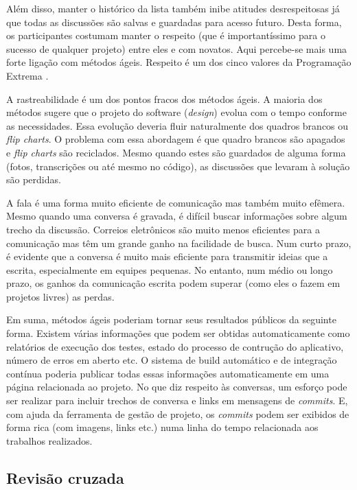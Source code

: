 Além disso, manter o histórico da lista também inibe atitudes
desrespeitosas já que todas as discussões são salvas e guardadas para
acesso futuro. Desta forma, os participantes costumam manter o
respeito (que é importantíssimo para o sucesso de qualquer projeto)
entre eles e com novatos. Aqui percebe-se mais uma forte ligação com
métodos ágeis. Respeito é um dos cinco valores da Programação Extrema
\cite{XP02}.

A rastreabilidade é um dos pontos fracos dos métodos ágeis. A maioria
dos métodos sugere que o projeto do software (\emph{design}) evolua
com o tempo conforme as necessidades. Essa evolução deveria fluir
naturalmente dos quadros brancos ou \emph{flip charts}. O problema com
essa abordagem é que quadro brancos são apagados e \emph{flip charts}
são reciclados.  Mesmo quando estes são guardados de alguma forma
(fotos, transcrições ou até mesmo no código), as discussões que
levaram à solução são perdidas.

A fala é uma forma muito eficiente de comunicação mas também muito
efêmera. Mesmo quando uma conversa é gravada, é difícil buscar
informações sobre algum trecho da discussão. Correios eletrônicos são
muito menos eficientes para a comunicação mas têm um grande ganho na
facilidade de busca. Num curto prazo, é evidente que a conversa é
muito mais eficiente para transmitir ideias que a escrita,
especialmente em equipes pequenas. No entanto, num médio ou longo
prazo, os ganhos da comunicação escrita podem superar (como eles o
fazem em projetos livres) as perdas.

Em suma, métodos ágeis poderiam tornar seus resultados públicos da
seguinte forma. Existem várias informações que podem ser obtidas
automaticamente como relatórios de execução dos testes, estado do
processo de contrução do aplicativo, número de erros em aberto etc.
O sistema de build automático e de integração contínua poderia
publicar todas essas informações automaticamente em uma página
relacionada ao projeto. No que diz respeito às conversas, um esforço
pode ser realizar para incluir trechos de conversa e links em
mensagens de \textit{commits}. E, com ajuda da ferramenta de gestão de
projeto, os \textit{commits} podem ser exibidos de forma rica (com
imagens, links etc.) numa linha do tempo relacionada aos trabalhos
realizados.

\subsection{Revisão cruzada}
\label{subsec:crossrev}

